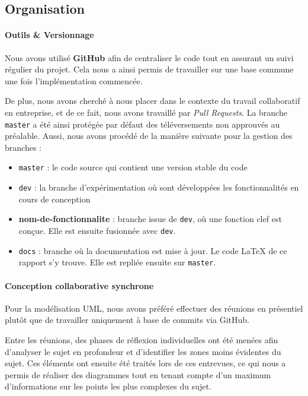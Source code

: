 \documentclass[paper=a4,fontsize=12pt,titlepage]{scrartcl}
\begin{document}
    \subsection{Organisation}\label{subsec:organisation}

    \paragraph{Outils \& Versionnage}
    Nous avons utilisé \textbf{GitHub} afin de centraliser le code tout en assurant un suivi régulier du projet.
    Cela nous a ainsi permis de travailler sur une base commune une fois l'implémentation commencée.

    De plus, nous avons cherché à nous placer dans le contexte du travail collaboratif en entreprise, et de ce fait,
    nous avons travaillé par \textit{Pull Requests}. La branche \verb|master| a été ainsi protégée par défaut des
    téléversements non approuvés au préalable. Aussi, nous avons procédé de la manière suivante pour la gestion des branches :
    \begin{itemize}
        \item \verb|master| : le code source qui contient une version stable du code
        \item \verb|dev| : la branche d'expérimentation où sont développées les fonctionnalités en cours de conception
        \item \textbf{nom-de-fonctionnalite} : branche issue de \verb|dev|, où une fonction clef est conçue. Elle est ensuite fusionnée avec \verb|dev|.
        \item \verb|docs| : branche où la documentation est mise à jour. Le code \LaTeX\; de ce rapport s'y trouve. Elle est repliée ensuite sur \verb|master|.
    \end{itemize}

    \paragraph{Conception collaborative synchrone}
    Pour la modélisation UML, nous avons préféré effectuer des réunions en présentiel plutôt que de travailler
    uniquement à base de commits via GitHub.

    Entre les réunions, des phases de réflexion individuelles ont été menées afin d'analyser le sujet en profondeur
    et d'identifier les zones moins évidentes du sujet. Ces éléments ont ensuite été traités lors de ces entrevues,
    ce qui nous a permis de réaliser des diagrammes tout en tenant compte d'un maximum d'informations sur les points
    les plus complexes du sujet.
\end{document}

